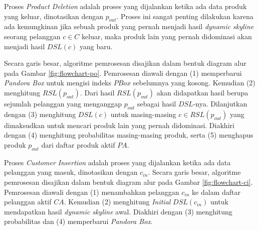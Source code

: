 
Proses \textit{Product Deletion} adalah proses yang dijalankan ketika ada data produk yang keluar, dinotasikan dengan $p_{out}$. Proses ini sangat penting dilakukan karena ada kemungkinan jika sebuah produk yang pernah menjadi hasil \textit{dynamic skyline} seorang pelanggan $c \in C$ keluar, maka produk lain yang pernah didominasi akan menjadi hasil $DSL(c)$ yang baru.

Secara garis besar, algoritme pemrosesan disajikan dalam bentuk diagram alur pada Gambar \ref{fig:flowchart-po}. Pemrosesan diawali dengan (1) memperbarui \textit{Pandora Box} untuk mengisi indeks $PBox$ sebelumnya yang kosong. Kemudian (2) menghitung $RSL(p_{out})$. Dari hasil $RSL(p_{out})$ akan didapatkan hasil berupa sejumlah pelanggan yang menganggap $p_{out}$ sebagai hasil $DSL$-nya. Dilanjutkan dengan (3) menghitung $DSL(c)$ untuk masing-masing $c \in RSL(p_{out})$ yang dimaksudkan untuk mencari produk lain yang pernah didominasi. Diakhiri dengan (4) menghitung probabilitas masing-masing produk, serta (5) menghapus produk $p_{out}$ dari daftar produk aktif $PA$.


Proses \textit{Customer Insertion} adalah proses yang dijalankan ketika ada data pelanggan yang masuk, dinotasikan dengan $c_{in}$. Secara garis besar, algoritme pemrosesan disajikan dalam bentuk diagram alur pada Gambar \ref{fig:flowchart-ci}. Pemrosesan diawali dengan (1) menambahkan pelanggan $c_{in}$ ke dalam daftar pelanggan aktif $CA$. Kemudian (2) menghitung \textit{Initial} $DSL(c_{in})$ untuk mendapatkan hasil \textit{dynamic skyline} awal. Diakhiri dengan (3) menghitung probabilitas dan (4) memperbarui \textit{Pandora Box}.

